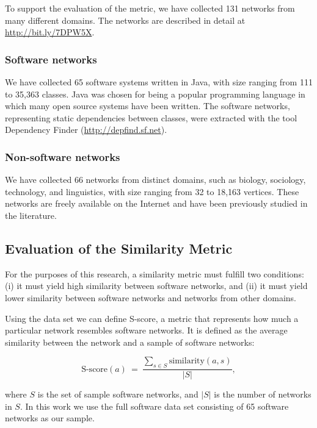 To support the evaluation of the metric, we have collected 131 networks from
many different domains. The networks are described in detail at
\url{http://bit.ly/7DPW5X}.

\subsubsection{Software networks} We have collected 65 software systems written
in Java, with size ranging from 111 to 35,363 classes. Java was chosen for
being a popular programming language in which many open source systems have
been written. The software networks, representing static dependencies between
classes, were extracted with the tool Dependency Finder
(\url{http://depfind.sf.net}).

\subsubsection{Non-software networks} We have collected 66 networks from
distinct domains, such as biology, sociology, technology, and linguistics, with
size ranging from 32 to 18,163 vertices. These networks are freely available on
the Internet and have been previously studied in the literature.

\subsection{Evaluation of the Similarity Metric}


For the purposes of this research, a similarity metric must fulfill two
conditions: (i) it must yield high similarity between software networks, and
(ii) it must yield lower similarity between software networks and networks from
other domains.

Using the data set we can define S-score, a metric that represents how much a
particular network resembles software networks. It is defined as the average
similarity between the network and a sample of software networks:

$$
\mathrm{S\mbox{-}score}(a) ~=~ \frac{
\displaystyle\sum_{s \in S} \mathrm{similarity}(a, s)
}{|S|} \mathrm{,}
$$

where $S$ is the set of sample software networks, and $|S|$ is the number of
networks in $S$. In this work we use the full software data set consisting of
65 software networks as our sample.

